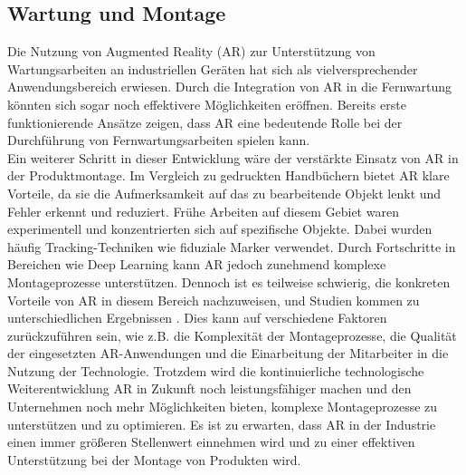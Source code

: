 \subsection{Wartung und Montage}
Die Nutzung von Augmented Reality (AR) zur Unterstützung von Wartungsarbeiten
an industriellen Geräten hat sich als vielversprechender Anwendungsbereich
erwiesen. Durch die Integration von AR in die Fernwartung könnten sich sogar
noch effektivere Möglichkeiten eröffnen. Bereits erste funktionierende Ansätze
zeigen, dass AR eine bedeutende Rolle bei der Durchführung von
Fernwartungsarbeiten spielen kann. \cite{masoni2017supporting} \\Ein weiterer
Schritt in dieser Entwicklung wäre der verstärkte Einsatz von AR in der
Produktmontage. Im Vergleich zu gedruckten Handbüchern bietet AR klare
Vorteile, da sie die Aufmerksamkeit auf das zu bearbeitende Objekt lenkt und
Fehler erkennt und reduziert. Frühe Arbeiten auf diesem Gebiet waren
experimentell und konzentrierten sich auf spezifische Objekte. Dabei wurden
häufig Tracking-Techniken wie fiduziale Marker verwendet. Durch Fortschritte in
Bereichen wie Deep Learning kann AR jedoch zunehmend komplexe Montageprozesse
unterstützen. Dennoch ist es teilweise schwierig, die konkreten Vorteile von AR
in diesem Bereich nachzuweisen, und Studien kommen zu unterschiedlichen
Ergebnissen \cite{tang2003comparative}. Dies kann auf verschiedene Faktoren
zurückzuführen sein, wie z.B. die Komplexität der Montageprozesse, die Qualität
der eingesetzten AR-Anwendungen und die Einarbeitung der Mitarbeiter in die
Nutzung der Technologie. Trotzdem wird die kontinuierliche technologische
Weiterentwicklung AR in Zukunft noch leistungsfähiger machen und den
Unternehmen noch mehr Möglichkeiten bieten, komplexe Montageprozesse zu
unterstützen und zu optimieren. Es ist zu erwarten, dass AR in der Industrie
einen immer größeren Stellenwert einnehmen wird und zu einer effektiven
Unterstützung bei der Montage von Produkten wird.\cite{8951930}

